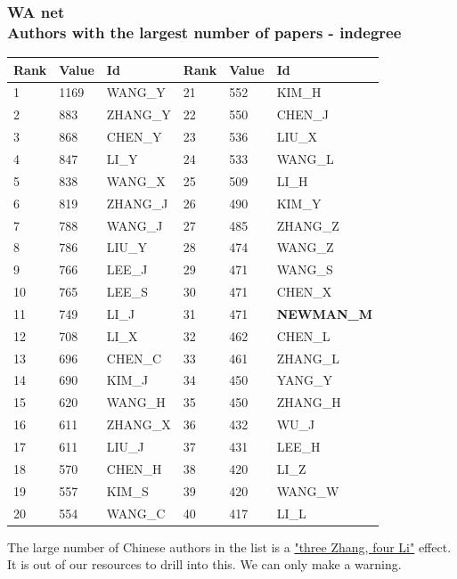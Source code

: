 \documentclass[hyperref={pdfstartview={FitBH -32768},
                         pdfpagemode=FullScreen,
                         plainpages=false,
                         colorlinks=true}
              ]{beamer}
\begin{document}
\begin{frame}[fragile]
\frametitle{WA net \label{numpap}\\ \normalsize Authors with the largest number of papers - indegree}

\renewcommand{\arraystretch}{0.82}
\tiny
\begin{center}
\begin{tabular}{l|l|l||l|l|l}
Rank& 	Value& 	Id& 	Rank& 	Value& 	Id\\  \hline   
1& 	1169& 	WANG\_Y& 	21& 	552& 	KIM\_H\\ 
2& 	883& 	ZHANG\_Y& 	22& 	550& 	CHEN\_J\\ 
3& 	868& 	CHEN\_Y& 	23& 	536& 	LIU\_X\\ 
4& 	847& 	LI\_Y& 	24& 	533& 	WANG\_L\\ 
5& 	838& 	WANG\_X& 	25& 	509& 	LI\_H\\ 
6& 	819& 	ZHANG\_J& 	26& 	490& 	KIM\_Y\\ 
7& 	788& 	WANG\_J& 	27& 	485& 	ZHANG\_Z\\ 
8& 	786& 	LIU\_Y& 	28& 	474& 	WANG\_Z\\ 
9& 	766& 	LEE\_J& 	29& 	471& 	WANG\_S\\ 
10& 	765& 	LEE\_S& 	30& 	471& 	CHEN\_X\\ 
11& 	749& 	LI\_J& 	31& 	471& 	\textbf{NEWMAN\_M}\\ 
12& 	708& 	LI\_X& 	32& 	462& 	CHEN\_L\\ 
13& 	696& 	CHEN\_C& 	33& 	461& 	ZHANG\_L\\ 
14& 	690& 	KIM\_J& 	34& 	450& 	YANG\_Y\\ 
15& 	620& 	WANG\_H& 	35& 	450& 	ZHANG\_H\\ 
16& 	611& 	ZHANG\_X& 	36& 	432& 	WU\_J\\ 
17& 	611& 	LIU\_J& 	37& 	431& 	LEE\_H\\ 
18& 	570& 	CHEN\_H& 	38& 	420& 	LI\_Z\\ 
19& 	557& 	KIM\_S& 	39& 	420& 	WANG\_W\\ 
20& 	554& 	WANG\_C& 	40& 	417& 	LI\_L\\ \hline  
\end{tabular}
\end{center}

\medskip
\footnotesize
The large number of Chinese authors in the list is a \href{https://en.wikipedia.org/wiki/List_of_common_Chinese_surnames}{"three Zhang, four Li"} effect. It is out of our resources to drill into this. We can only make a warning.

\end{frame}
\end{document}
